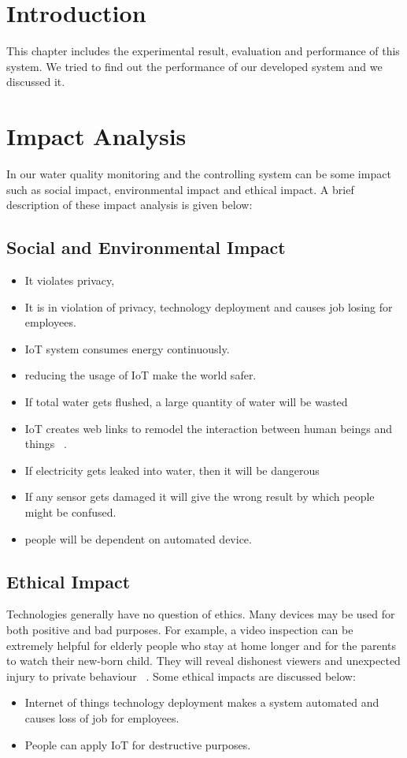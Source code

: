 \section{Introduction}
This chapter includes the experimental result, evaluation and performance of this system.
We tried to find out the performance of our developed system and we discussed it.

\section{Impact Analysis}
In our water quality monitoring and the controlling system can be some impact such as social impact, environmental impact and ethical impact. A brief description of these impact analysis is given below:
\subsection{Social and Environmental Impact}
\begin{itemize}
    \item It violates privacy,
    \item It is in violation of privacy, technology deployment and causes job losing for employees.
    \item IoT system consumes energy continuously.
    \item reducing the usage of IoT make the world safer.
    \item If total water gets flushed, a large quantity of water will be wasted
    \item IoT creates web links to remodel the interaction between human beings and things ~\cite{radu2018environmental}.
    \item If electricity gets leaked into water, then it will be dangerous
    \item If any sensor gets damaged it will give the wrong result by which people might be confused.
    \item people will be dependent on automated device.
\end{itemize}

\subsection{Ethical Impact}
Technologies generally have no question of ethics. Many devices may be used for both positive and bad purposes. For example, a video inspection can be extremely helpful for elderly people who stay at home longer and for the parents to watch their new-born child. They will reveal dishonest viewers and unexpected injury to private behaviour
~\cite{popescul2014internet}.
Some ethical impacts are discussed below:
\begin{itemize}
    \item Internet of things technology deployment makes a system automated and causes loss of job for employees.
    \item People can apply IoT for destructive purposes.
\end{itemize}

